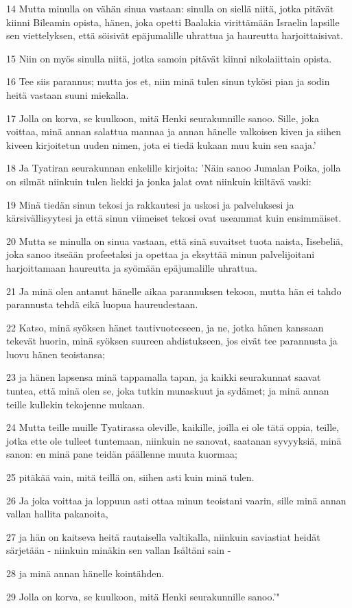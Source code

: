 \par 14 Mutta minulla on vähän sinua vastaan: sinulla on siellä niitä, jotka pitävät kiinni Bileamin opista, hänen, joka opetti Baalakia virittämään Israelin lapsille sen viettelyksen, että söisivät epäjumalille uhrattua ja haureutta harjoittaisivat.
\par 15 Niin on myös sinulla niitä, jotka samoin pitävät kiinni nikolaiittain opista.
\par 16 Tee siis parannus; mutta jos et, niin minä tulen sinun tykösi pian ja sodin heitä vastaan suuni miekalla.
\par 17 Jolla on korva, se kuulkoon, mitä Henki seurakunnille sanoo. Sille, joka voittaa, minä annan salattua mannaa ja annan hänelle valkoisen kiven ja siihen kiveen kirjoitetun uuden nimen, jota ei tiedä kukaan muu kuin sen saaja.'
\par 18 Ja Tyatiran seurakunnan enkelille kirjoita: 'Näin sanoo Jumalan Poika, jolla on silmät niinkuin tulen liekki ja jonka jalat ovat niinkuin kiiltävä vaski:
\par 19 Minä tiedän sinun tekosi ja rakkautesi ja uskosi ja palveluksesi ja kärsivällisyytesi ja että sinun viimeiset tekosi ovat useammat kuin ensimmäiset.
\par 20 Mutta se minulla on sinua vastaan, että sinä suvaitset tuota naista, Iisebeliä, joka sanoo itseään profeetaksi ja opettaa ja eksyttää minun palvelijoitani harjoittamaan haureutta ja syömään epäjumalille uhrattua.
\par 21 Ja minä olen antanut hänelle aikaa parannuksen tekoon, mutta hän ei tahdo parannusta tehdä eikä luopua haureudestaan.
\par 22 Katso, minä syöksen hänet tautivuoteeseen, ja ne, jotka hänen kanssaan tekevät huorin, minä syöksen suureen ahdistukseen, jos eivät tee parannusta ja luovu hänen teoistansa;
\par 23 ja hänen lapsensa minä tappamalla tapan, ja kaikki seurakunnat saavat tuntea, että minä olen se, joka tutkin munaskuut ja sydämet; ja minä annan teille kullekin tekojenne mukaan.
\par 24 Mutta teille muille Tyatirassa oleville, kaikille, joilla ei ole tätä oppia, teille, jotka ette ole tulleet tuntemaan, niinkuin ne sanovat, saatanan syvyyksiä, minä sanon: en minä pane teidän päällenne muuta kuormaa;
\par 25 pitäkää vain, mitä teillä on, siihen asti kuin minä tulen.
\par 26 Ja joka voittaa ja loppuun asti ottaa minun teoistani vaarin, sille minä annan vallan hallita pakanoita,
\par 27 ja hän on kaitseva heitä rautaisella valtikalla, niinkuin saviastiat heidät särjetään - niinkuin minäkin sen vallan Isältäni sain -
\par 28 ja minä annan hänelle kointähden.
\par 29 Jolla on korva, se kuulkoon, mitä Henki seurakunnille sanoo.'"

